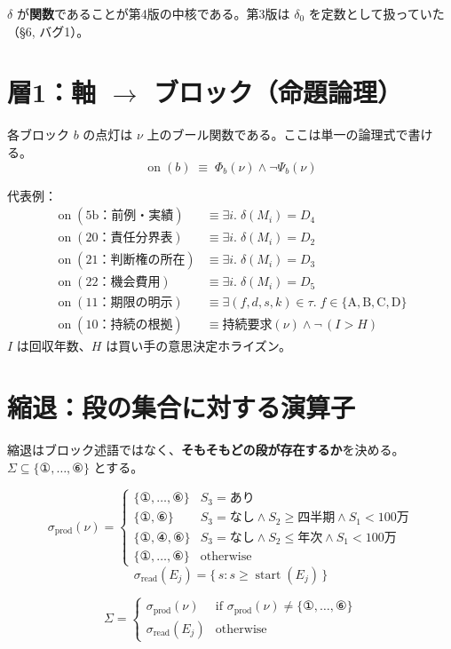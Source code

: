 \documentclass[11pt,a4paper]{article}
\newcommand{\on}{\operatorname{on}}
\newcommand{\start}{\operatorname{start}}
\begin{document}
$\delta$ が\textbf{関数}であることが第4版の中核である。第3版は $\delta_0$ を定数として扱っていた（\S6, バグ1）。

\section{層1：軸 $\to$ ブロック（命題論理）}

各ブロック $b$ の点灯は $\nu$ 上のブール関数である。ここは単一の論理式で書ける。
\[
\on(b) \;\equiv\; \Phi_b(\nu) \wedge \neg\Psi_b(\nu)
\]

代表例：
\begin{align}
\on(\text{5b：前例・実績}) &\equiv \exists i.\; \delta(M_i) = D_4 \\
\on(\text{20：責任分界表}) &\equiv \exists i.\; \delta(M_i) = D_2 \\
\on(\text{21：判断権の所在}) &\equiv \exists i.\; \delta(M_i) = D_3 \\
\on(\text{22：機会費用}) &\equiv \exists i.\; \delta(M_i) = D_5 \\
\on(\text{11：期限の明示}) &\equiv \exists (f,d,s,k) \in \tau.\; f \in \{\mathrm{A},\mathrm{B},\mathrm{C},\mathrm{D}\} \\
\on(\text{10：持続の根拠}) &\equiv \text{持続要求}(\nu) \wedge \neg\,(I > H)
\end{align}
$I$ は回収年数、$H$ は買い手の意思決定ホライズン。

\section{縮退：段の集合に対する演算子}

縮退はブロック述語ではなく、\textbf{そもそもどの段が存在するか}を決める。$\Sigma \subseteq \{①,\dots,⑥\}$ とする。

\[
\sigma_{\mathrm{prod}}(\nu) =
\begin{cases}
\{①,\dots,⑥\} & S_3 = \text{あり} \\[2pt]
\{①,⑥\} & S_3 = \text{なし} \wedge S_2 \geq \text{四半期} \wedge S_1 < 100\text{万} \\[2pt]
\{①,④,⑥\} & S_3 = \text{なし} \wedge S_2 \leq \text{年次} \wedge S_1 < 100\text{万} \\[2pt]
\{①,\dots,⑥\} & \text{otherwise}
\end{cases}
\]
\[
\sigma_{\mathrm{read}}(E_j) = \{\, s : s \geq \start(E_j) \,\}
\]

\begin{equation}\label{eq:sigma}
\boxed{\;
\Sigma =
\begin{cases}
\sigma_{\mathrm{prod}}(\nu) & \text{if } \sigma_{\mathrm{prod}}(\nu) \neq \{①,\dots,⑥\} \\
\sigma_{\mathrm{read}}(E_j) & \text{otherwise}
\end{cases}
\;}
\end{equation}
\end{document}
